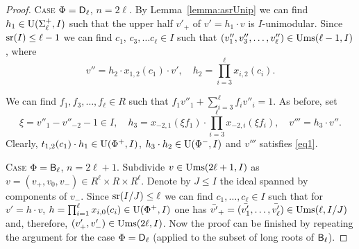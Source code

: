 \begin{proof}
\textsc{Case $\Phi=\mathsf{D}_\ell$, $n= 2\ell$.} 
By Lemma~\ref{lemma:asrUnip} we can find $h_1\in \operatorname{U}(\Sigma^+_\ell, I)$ such that the upper half $v'_+$ of $v'=h_1 \cdot v$ is $I$-unimodular.
Since $\operatorname{sr}(I)\leq \ell-1$ we can find $c_1$, $c_3, \ldots c_\ell \in I$ such that $(v''_1, v''_3, \ldots, v''_\ell) \in \operatorname{Ums}(\ell-1, I)$, where
\[ v''=h_2 \cdot x_{1,2}(c_1) \cdot v', \quad h_2=\prod_{i=3}^\ell x_{i,2}(c_i). \]

We can find $f_1, f_3,\ldots, f_\ell \in R$ such that $f_1v''_1+\sum_{i=3}^\ell f_i v''_{i} = 1$.
As before, set
\[ \xi = v''_1-v''_{-2}-1 \in I, \quad h_3 = x_{-2,1}(\xi f_1) \cdot \prod_{i=3}^\ell x_{-2,i}(\xi f_i), \quad v'''=h_3 \cdot v''. \]
Clearly, $t_{1,2}(c_1) \cdot h_1 \in \operatorname{U}(\Phi^+, I)$, $ h_3 \cdot h_2 \in \operatorname{U}(\Phi^-, I)$ and $v'''$ satisfies \ref{eq1}.

\textsc{Case $\Phi=\mathsf{B}_\ell$, $n=2\ell+1$.} Subdivide $v\in \operatorname{Ums}(2\ell+1, I)$ as $v=(v_+, v_0, v_-)\in R^\ell\times R\times R^\ell$.
Denote by $J\leq I$ the ideal spanned by components of $v_-$.
Since $\operatorname{sr}(I/J)\leq \ell$ we can find $c_1,\dots,c_\ell\in I$ such that for $v' = h \cdot v$, $h = \prod_{i=1}^\ell x_{i,0}(c_i) \in \operatorname{U}(\Phi^+, I)$
one has $\bar{v'}_+=(\bar{v'_1},\ldots, \bar{v'_\ell}) \in \operatorname{Ums}(\ell, I/J)$ and, therefore, $(v'_+, v'_-) \in \operatorname{Ums}(2\ell, I)$.
Now the proof can be finished by repeating the argument for the case $\Phi=\mathsf{D}_\ell$ (applied to the subset of long roots of $\mathsf{B}_\ell$).
\end{proof}

